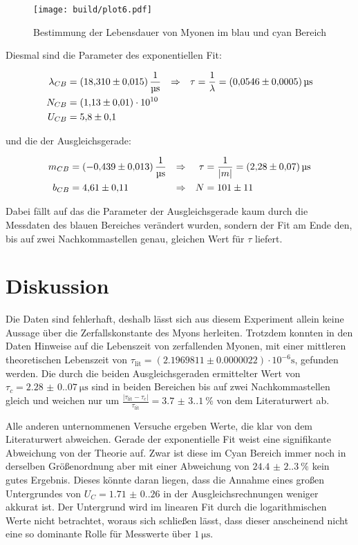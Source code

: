 \begin{figure}[H]
	\centering
	\texttt{[image: build/plot6.pdf]}
	\caption{Bestimmung der Lebensdauer von Myonen im blau und cyan Bereich}\label{fig:plt6}
\end{figure}

\newpage
Diesmal sind die Parameter des exponentiellen Fit:

\begin{align}
	\lambda_{CB}&=\qty{18.31(0.015)}{\per\us} &\Rightarrow & & \tau&=\frac{1}{\lambda }=\qty{0.0546(0.0005)}{\us} \\ 
	N_{CB}&=\num{1.13(0.1)e10} \notag \\
	U_{CB}&=\num{5.8(1)} \notag
\end{align}

und die der Ausgleichsgerade:

\begin{align}
	m_{CB}&=\qty{-0.439(0.013)}{\per\us} &\Rightarrow & & \tau&=\frac{1}{|m|}=\qty{2.28(0.07)}{\us} \\ \label{eq:good_tau}
	b_{CB}&=\num{4.61(0.11)} &\Rightarrow & & N&=\num{101(11)} \notag
\end{align}

Dabei fällt auf das die Parameter der Ausgleichsgerade kaum durch die Messdaten des blauen Bereiches verändert wurden, 
sondern der Fit am Ende den, bis auf zwei Nachkommastellen genau, gleichen Wert für $\tau $ liefert. 

\newpage
\section{Diskussion}
Die Daten sind fehlerhaft, deshalb lässt sich aus diesem Experiment allein keine Aussage über die Zerfallskonstante des
Myons herleiten. Trotzdem konnten in den Daten Hinweise auf die Lebenszeit von zerfallenden Myonen, 
mit einer mittleren theoretischen Lebenszeit von $\tau_\text{lit} = (2.1969811 \pm0.0000022)\cdot 10^{-6}\unit{\s}$\cite{Workman:2022ynf}, gefunden werden. 
Die durch die beiden Ausgleichsgeraden ermittelter Wert von $\tau_c= \qty{2.28(0.07)}{\us}$ sind in beiden Bereichen bis auf zwei Nachkommastellen gleich und weichen nur um 
$\frac{|\tau_\text{lit} - \tau_c|}{\tau_\text{lit}} = \qty{3.7(3.1)}{\percent}$ von dem Literaturwert ab. 

Alle anderen unternommenen Versuche ergeben Werte, die klar von dem Literaturwert abweichen.
Gerade der exponentielle Fit weist eine signifikante Abweichung von der Theorie auf. 
Zwar ist diese im Cyan Bereich immer noch in derselben Größenordnung aber mit einer Abweichung von $\qty{24.4(2.3)}{\percent}$ kein gutes Ergebnis.
Dieses könnte daran liegen, dass die Annahme eines großen Untergrundes von $U_C=\num{1.71(0.26)}$ in der Ausgleichsrechnungen weniger akkurat ist.
Der Untergrund wird im linearen Fit durch die logarithmischen Werte nicht betrachtet, woraus sich schließen lässt, 
dass dieser anscheinend nicht eine so dominante Rolle für Messwerte über $\qty{1}{\us} $. 

